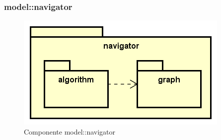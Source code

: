 \documentclass[../DefinizioneDiProdotto.tex]{subfiles}
\begin{document}
\subsubsection{model::\-navigator}

    \begin{figure}[H]
        \centering
        \includegraphics{img/package/navigator.png}
        \caption{Componente model::\-navigator}\label{fig:model::navigator} 
    \end{figure}
\end{document}
